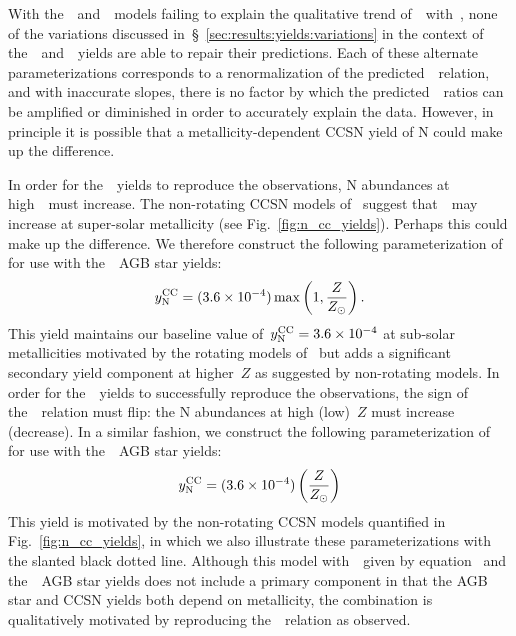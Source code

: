 \documentclass[ms.tex]{subfiles}
\begin{document}
With the~\karakasten~and~\karakas~models failing to explain the qualitative
trend of~\no~with~\oh, none of the variations discussed
in~\S~\ref{sec:results:yields:variations} in the context of
the~\cristallo~and~\ventura~yields are able to repair their predictions.
Each of these alternate parameterizations corresponds to a renormalization of
the predicted~\ohno~relation, and with inaccurate slopes, there is no factor by
which the predicted~\no~ratios can be amplified or diminished in order to
accurately explain the data.
However, in principle it is possible that a metallicity-dependent CCSN yield
of N could make up the difference.
\par
In order for the~\karakas~yields to reproduce the observations, N abundances at
high~\oh~must increase.
The non-rotating CCSN models of~\citet{Nomoto2013} suggest that~~may
increase at super-solar metallicity (see Fig.~\ref{fig:n_cc_yields}).
Perhaps this could make up the difference.
We therefore construct the following parameterization of~ for use with
the~\karakas~AGB star yields:
\begin{equation}
y_\text{N}^\text{CC} = (3.6\times10^{-4})\max\left(1, \frac{Z}{Z_\odot}\right).
\label{eq:broken_yncc}
\end{equation}
This yield maintains our baseline value of~$y_\text{N}^\text{CC} = 3.6\times10^{-4}$ at
sub-solar metallicities motivated by the rotating models of~\citet{Limongi2018}
but adds a significant secondary yield component at higher~$Z$ as suggested
by non-rotating models.
In order for the~\karakasten~yields to successfully reproduce the observations,
the sign of the~\ohno~relation must flip: the N abundances at high (low)~$Z$
must increase (decrease).
In a similar fashion, we construct the following parameterization of~ for
use with the~\karakasten~AGB star yields:
\begin{equation}
y_\text{N}^\text{CC} = (3.6\times10^{-4})\left(\frac{Z}{Z_\odot}\right)
\label{eq:linear_yncc}
\end{equation}
This yield is motivated by the non-rotating CCSN models quantified in
Fig.~\ref{fig:n_cc_yields}, in which we also illustrate these parameterizations
with the slanted black dotted line.
Although this model with~~given by equation~ and
the~\karakasten~AGB star yields does not include a primary component in that
the AGB star and CCSN yields both depend on metallicity, the combination is
qualitatively motivated by reproducing the~\ohno~relation as observed.
\end{document}
